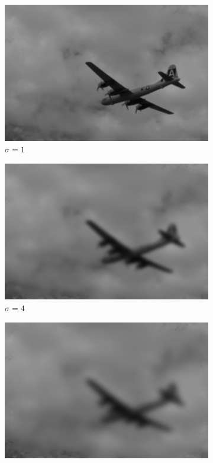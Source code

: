 \documentclass{article}
\begin{document}
\begin{figure}[!h]
  \begin{subfigure}{0.3\textwidth}
    \includegraphics[width=\textwidth]{planesig1}
    \caption{$\sigma = 1$}
    \label{fig:f1}
  \end{subfigure}
  \hfill
  \begin{subfigure}{0.3\textwidth}
    \includegraphics[width=\textwidth]{planesig4}
    \caption{$\sigma = 4$}
    \label{fig:f2}
  \end{subfigure}
   \hfill
  \begin{subfigure}{0.3\textwidth}
    \includegraphics[width=\textwidth]{planesig7}

\end{subfigure}
\end{figure}
\end{document}

